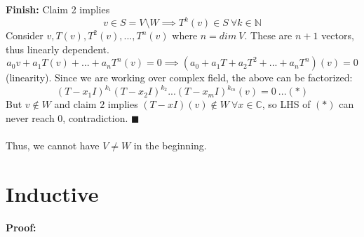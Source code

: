 \documentclass{article}
\begin{document}
\textbf{Finish:} Claim 2 implies $$v\in S=V\setminus W\implies T^k(v)\in S\ \forall k\in \mathbb{N}$$Consider $v,T(v),T^2(v),...,T^n(v)$ where $n=dim\ V$. These are $n+1$ vectors, thus linearly dependent. $$a_0v+a_1T(v)+...+a_nT^n(v)=0\implies (a_0+a_1T+a_2T^2+...+a_nT^n)(v)=0$$(linearity). Since we are working over complex field, the above can be factorized: $$(T-x_1I)^{k_1} (T-x_2I)^{k_2}...(T-x_mI)^{k_m}(v)=0\ ...(*)$$But $v\notin W$ and claim $2$ implies $(T-xI)(v)\notin W\ \forall x\in \mathbb{C}$, so LHS of $(*)$ can never reach $0$, contradiction. $\blacksquare$ \\ \\

Thus, we cannot have $V\neq W$ in the beginning.






\section{Inductive}
\textbf{Proof:}
\end{document}
